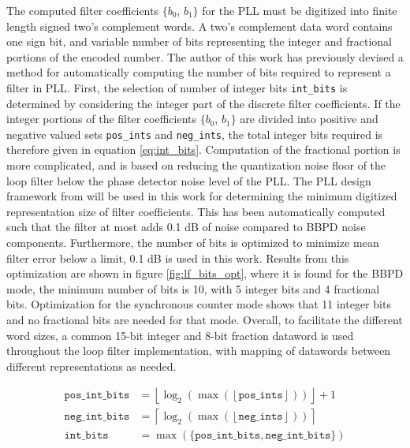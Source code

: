 			The computed filter coefficients $\{b_0$, $b_1\}$ for the PLL must be digitized into finite length signed two's complement words. A two's complement data word contains one sign bit, and variable number of bits representing the integer and fractional portions of the encoded number. The author of this work has previously devised a method \cite{Me} for automatically computing the number of bits required to represent a filter in PLL. First, the selection of number of integer bits \texttt{int\_bits} is determined by considering the integer part of the discrete filter coefficients. If the integer portions of the filter coefficients $\{b_0$, $b_1\}$ are divided into positive and negative valued sets \texttt{pos\_ints} and \texttt{neg\_ints}, the total integer bits required is therefore given in equation \ref{eq:int_bits}. Computation of the fractional portion is more complicated, and is based on reducing the quantization noise floor of the loop filter below the phase detector noise level of the PLL. The PLL design framework from \cite{Me} will be used in this work for determining the minimum digitized representation size of filter coefficients. This has been automatically computed such that the filter at most adds 0.1 dB of noise compared to BBPD noise components. Furthermore, the number of bits is optimized to minimize mean filter error below a limit, 0.1 dB is used in this work. Results from this optimization are shown in figure \ref{fig:lf_bits_opt}, where it is found for the BBPD mode, the minimum number of bits is 10, with 5 integer bits and 4 fractional bits. Optimization for the synchronous counter mode shows that 11 integer bits and no fractional bits are needed for that mode. Overall, to facilitate the different word sizes, a common 15-bit integer and 8-bit fraction dataword is used throughout the loop filter implementation, with mapping of datawords between different representations as needed.

			\begin{align}
				\mathtt{pos\_int\_bits} &= \left\lfloor \log_2\left(\max\left(\left\lfloor \mathtt{pos\_ints} \right\rfloor\right)\right) \right\rfloor +1\\
				\mathtt{neg\_int\_bits} &= \left\lceil \log_2\left(\max\left(\left\lfloor \mathtt{neg\_ints} \right\rfloor\right)\right) \right\rceil\\
				\mathtt{int\_bits} &= \max(\mathtt{\{pos\_int\_bits}, \mathtt{neg\_int\_bits}\})\label{eq:int_bits}
			\end{align}


